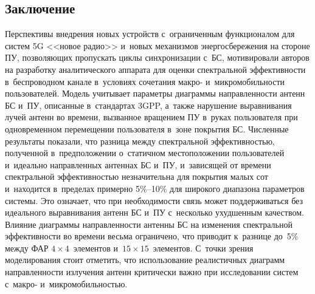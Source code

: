 \begin{multicols}{2}
\section{Заключение}

  Перспективы внедрения новых устройств с~ограниченным функционалом для 
систем 5G <<новое радио>> и~новых механизмов энергосбережения на стороне 
ПУ, позволяющих пропускать циклы синхронизации с~БС, мотивировали авторов 
на разработку аналитического аппарата для оценки спектральной эффективности 
в~беспроводном канале в~условиях сочетания макро- и~мик\-ро\-мо\-биль\-ности\linebreak 
пользователей. Модель учитывает параметры диаграммы направленности антенн 
БС и~ПУ, описанные в~стандартах 3GPP, а~также нарушение выравнивания лучей 
антенн во времени, вызванное \mbox{вращением} ПУ в~руках пользователя при 
одновременном перемещении пользователя в~зоне покрытия БС. Численные 
результаты показали, что разница между спектральной эффективностью, 
\mbox{полученной} в~предположении о~статичном местоположении пользователей 
и~идеально направленных антеннах БС и~ПУ, и~зависящей от времени 
спектральной эффективностью незначительна для покрытия малых сот 
и~находится в~пределах примерно 5\%--10\% для широкого диапазона па\-ра\-мет\-ров 
системы. Это означает, что при необходимости связь может поддерживаться без 
идеального выравнивания антенн БС и~ПУ с~несколько ухудшенным качеством. 
Влияние диаграммы на\-прав\-лен\-ности антенны БС на изменения спект\-раль\-ной 
эф\-фек\-тив\-ности во времени весьма ограничено, что приводит к~разнице до~5\% 
между ФАР $4\times4$~элементов и~$15\times15$~элементов. С~точки зрения 
моделирования стоит отметить, что использование реалистичных диаграмм 
на\-прав\-лен\-ности излучения антенн критически важно при исследовании сис\-тем 
с~макро- и~мик\-ро\-мо\-биль\-ностью.
  

\end{multicols}
